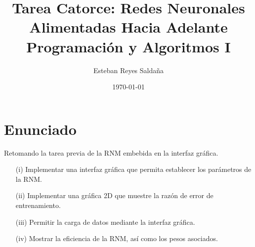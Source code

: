 \documentclass[12pt,letterpaper]{article}
\title{ \textbf{Tarea Catorce: Redes Neuronales Alimentadas Hacia Adelante} \\ Programación y Algoritmos I}
\author{Esteban Reyes Saldaña}
\date{\today}
\theoremstyle{definition}
\theoremstyle{definition}
\theoremstyle{definition}
\theoremstyle{definition}
\theoremstyle{definition}
\theoremstyle{definition}
\begin{document}
	
\maketitle 
\section*{Enunciado}
	Retomando la tarea previa de la RNM
	embebida en la interfaz gráfica.
	\begin{itemize}
		\item[(i)] Implementar una interfaz gráfica que permita establecer los parámetros de la RNM.
		\item[(ii)] Implementar una gráfica 2D que muestre la razón de error de entrenamiento.
		\item[(iii)] Permitir la carga de datos mediante la interfaz gráfica.
		\item[(iv)] Mostrar la eficiencia de la RNM, así como los pesos asociados.
	\end{itemize}

\end{document}

